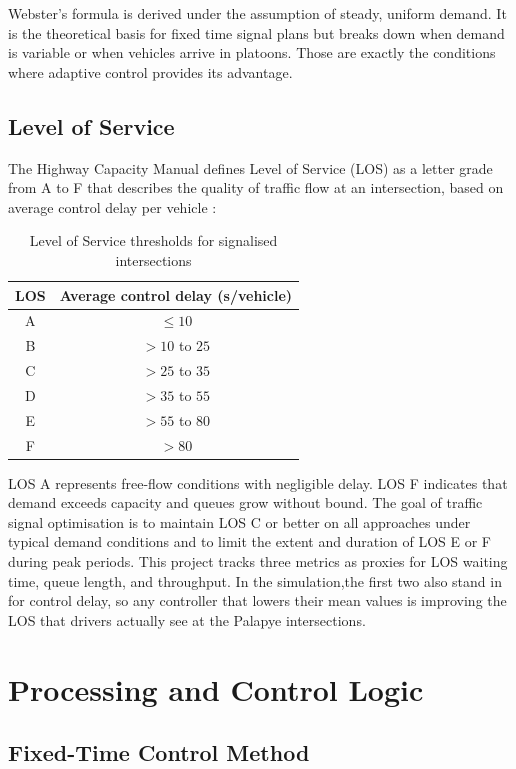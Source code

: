 ﻿\documentclass[11pt, a4paper]{report}
\begin{document}
Webster's formula is derived under the assumption of steady, uniform demand. It is the theoretical basis for fixed time signal plans but breaks down when demand is variable or when vehicles arrive in platoons. Those are exactly the conditions where adaptive control provides its advantage.

\subsection{Level of Service}

The Highway Capacity Manual defines Level of Service (LOS) as a letter grade from A to F that describes the quality of traffic flow at an intersection, based on average control delay per vehicle \cite{michailidis2025traffic}:

\begin{table}[H]
\centering
\caption{Level of Service thresholds for signalised intersections}
\label{tab:los}
\begin{tabular}{cc}
\toprule
\textbf{LOS} & \textbf{Average control delay (s/vehicle)} \\
\midrule
A & $\leq 10$ \\
B & $> 10$ to $25$ \\
C & $> 25$ to $35$ \\
D & $> 35$ to $55$ \\
E & $> 55$ to $80$ \\
F & $> 80$ \\
\bottomrule
\end{tabular}
\end{table}

LOS A represents free-flow conditions with negligible delay. LOS F indicates that demand exceeds capacity and queues grow without bound. The goal of traffic signal optimisation is to maintain LOS C or better on all approaches under typical demand conditions and to limit the extent and duration of LOS E or F during peak periods. This project tracks three metrics as proxies for LOS waiting time, queue length, and throughput. In the simulation,the first two also stand in for control delay, so any controller that lowers their mean values is improving the LOS that drivers actually see at the Palapye intersections.

\section{Processing and Control Logic}

\subsection{Fixed-Time Control Method}
\end{document}
